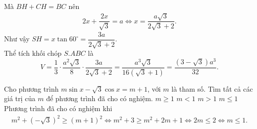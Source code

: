 \begin{ex}
{{
  }
  \noindent
  Mà $BH+CH=BC$ nên
  \begin{eqnarray*}
   2x+\dfrac{2x}{\sqrt{3}}=a \Leftrightarrow x=\dfrac{a\sqrt{3}}{2\sqrt{3}+2}.
  \end{eqnarray*}
  Như vậy $SH=x\tan 60^\circ=\dfrac{3a}{2\sqrt{3}+2}$.\\
  Thể tích khối chóp $S.ABC$ là
  $$V=\dfrac{1}{3}\cdot\dfrac{a^2\sqrt{3}}{8}\cdot\dfrac{3a}{2\sqrt{3}+2}=\dfrac{a^3\sqrt{3}}{16\left(\sqrt{3}+1\right)}=\dfrac{\left(3-\sqrt{3}\right)a^3}{32}.$$
  }
\end{ex}

\begin{ex}%
 Cho phương trình $m\sin x-\sqrt{3}\cos x=m+1$, với $m$ là tham số. Tìm tất cả các giá trị của $m$ để phương trình đã cho có nghiệm.
 \choice
  {$m\geq 1$}
  {$m<1$}
  {$m>1$}
  {\True $m\leq 1$}
 \loigiai
  {
  Phương trình đã cho có nghiệm khi
  \begin{eqnarray*}
   m^2+\left(-\sqrt{3}\right)^2 \geq (m+1)^2 \Leftrightarrow m^2+3 \geq m^2+2m+1 \Leftrightarrow 2m \leq 2 \Leftrightarrow m\leq 1.
  \end{eqnarray*}
  }
\end{ex}

